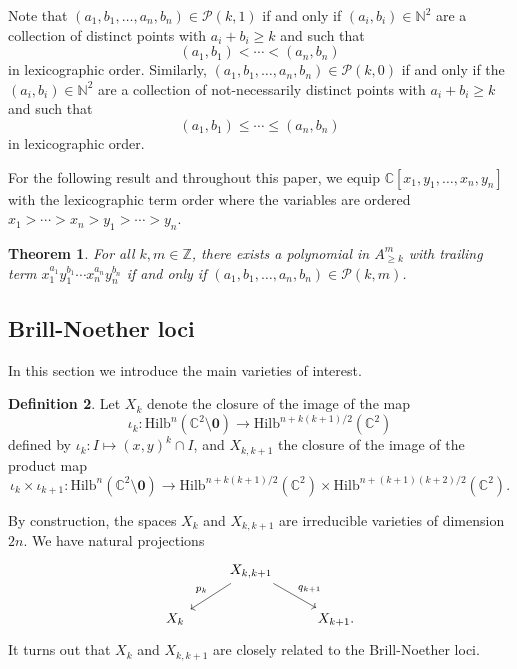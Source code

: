 \documentclass[12pt]{amsart}
\newcommand{\Hilb}{\mathrm{Hilb}}
\newcommand{\C}{\mathbb{C}}
\newcommand{\Z}{\mathbb{Z}}
\newcommand{\N}{\mathbb{N}}
\numberwithin{equation}{section}
\newtheorem{theorem}{Theorem}[section]
\theoremstyle{definition}
\newtheorem{definition}[theorem]{Definition}
\begin{document}
Note that $(a_1,b_1,\dots,a_n,b_n)\in \mathcal{P}(k,1)$ if and only if  $(a_i,b_i)\in \N^2$ are a collection of distinct points with $a_i+b_i\geq k$ and such that
\[ (a_1,b_1)<\cdots<(a_n,b_n) \]
in lexicographic order. Similarly, $(a_1,b_1,\dots,a_n,b_n)\in\mathcal{P}(k,0)$ if and only if the $(a_i,b_i)\in \N^2$ are a collection of not-necessarily distinct points with $a_i+b_i\geq k$ and such that
\[ (a_1,b_1)\leq\cdots\leq(a_n,b_n) \]
in lexicographic order.

For the following result and throughout this paper, we equip $\C[x_1,y_1,\dots,x_n,y_n]$ with the lexicographic term order where the variables are ordered $x_1>\cdots>x_n>y_1>\cdots>y_n$.

\begin{theorem}\label{thm:HS lead terms}\cite{CGOT}
    For all $k,m\in \Z$, there exists a polynomial in $A^m_{\geq k}$ with trailing term $x_1^{a_1}y_1^{b_1}\cdots x_n^{a_n}y_n^{b_n}$ if and only if $(a_1,b_1,\dots,a_n,b_n)\in \mathcal{P}(k,m)$.
\end{theorem}



\subsection{Brill-Noether loci}\label{sec:BN}

In this section we introduce the main varieties of interest.

\begin{definition}
    Let $X_k$ denote the closure of the image of the map
    \[\iota_{k}: \Hilb^n(\C^2\setminus \mathbf{0}) \to \Hilb^{n+k(k+1)/2}(\C^2)\]
    defined by $\iota_{k}:I\mapsto (x,y)^k\cap I$, and $X_{k,k+1}$ the closure of the image of the product map
    \[ \iota_k\times \iota_{k+1}: \Hilb^n(\C^2\setminus \mathbf{0}) \to \Hilb^{n+k(k+1)/2}(\C^2)\times \Hilb^{n+(k+1)(k+2)/2}(\C^2). \]
\end{definition}

By construction, the spaces $X_k$ and $X_{k,k+1}$ are irreducible varieties of dimension $2n$. We have natural projections
\begin{equation}
\label{eq: def p q maps}
\begin{tikzcd}
 & X_{k,k+1} \arrow[swap]{dl}{p_k} \arrow{dr}{q_{k+1}} & \\
 X_k & & X_{k+1}.
\end{tikzcd}
\end{equation}
It turns out that $X_k$ and $X_{k,k+1}$ are closely related to the Brill-Noether loci.
\end{document}
